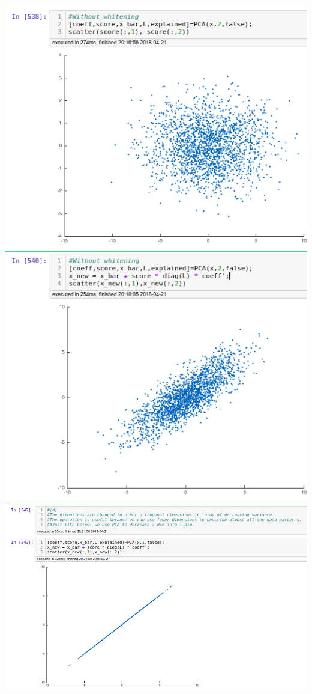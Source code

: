 \documentclass[12pt,letterpaper,fleqn]{hmcpset}
\begin{document}
\begin{solution}
\includegraphics[width=1\textwidth]{4.jpg}\\
\includegraphics[width=1\textwidth]{5.jpg}\\
\end{solution}
\end{document}
